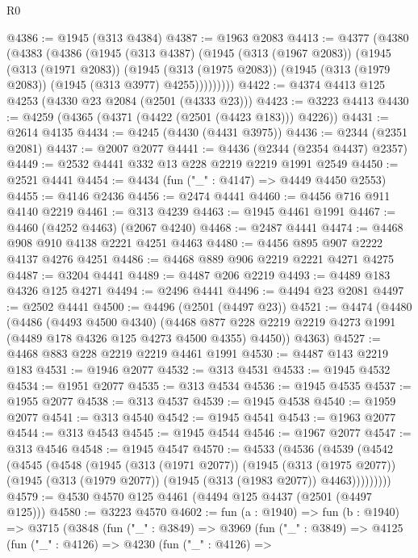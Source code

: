 \begin{lexlean}{R0}
\begin{coremodule}
@4386 := @1945 (@313 @4384)
@4387 := @1963 @2083
@4413 := @4377
    (@4380
      (@4383
        (@4386
          (@1945
            (@313 @4387)
            (@1945
              (@313 (@1967 @2083))
              (@1945
                (@313 (@1971 @2083))
                (@1945
                  (@313 (@1975 @2083))
                  (@1945 (@313 (@1979 @2083)) (@1945 (@313 @3977) @4255)))))))))
@4422 := @4374 @4413 @125 @4253 (@4330 @23 @2084 (@2501 (@4333 @23)))
@4423 := @3223 @4413
@4430 := @4259 (@4365 (@4371 (@4422 (@2501 (@4423 @183))) @4226))
@4431 := @2614 @4135
@4434 := @4245 (@4430 (@4431 @3975))
@4436 := @2344 (@2351 @2081)
@4437 := @2007 @2077
@4441 := @4436 (@2344 (@2354 @4437) @2357)
@4449 := @2532 @4441 @332 @13 @228 @2219 @2219 @1991 @2549
@4450 := @2521 @4441
@4454 := @4434 (fun ("_" : @4147) => @4449 @4450 @2553)
@4455 := @4146 @2436
@4456 := @2474 @4441
@4460 := @4456 @716 @911 @4140 @2219
@4461 := @313 @4239
@4463 := @1945 @4461 @1991
@4467 := @4460 (@4252 @4463) (@2067 @4240)
@4468 := @2487 @4441
@4474 := @4468 @908 @910 @4138 @2221 @4251 @4463
@4480 := @4456 @895 @907 @2222 @4137 @4276 @4251
@4486 := @4468 @889 @906 @2219 @2221 @4271 @4275
@4487 := @3204 @4441
@4489 := @4487 @206 @2219
@4493 := @4489 @183 @4326 @125 @4271
@4494 := @2496 @4441
@4496 := @4494 @23 @2081
@4497 := @2502 @4441
@4500 := @4496 (@2501 (@4497 @23))
@4521 := @4474
    (@4480
      (@4486
        (@4493 @4500 @4340)
        (@4468 @877 @228 @2219 @2219 @4273 @1991 (@4489 @178 @4326 @125 @4273 @4500 @4355) @4450))
      @4363)
@4527 := @4468 @883 @228 @2219 @2219 @4461 @1991
@4530 := @4487 @143 @2219 @183
@4531 := @1946 @2077
@4532 := @313 @4531
@4533 := @1945 @4532
@4534 := @1951 @2077
@4535 := @313 @4534
@4536 := @1945 @4535
@4537 := @1955 @2077
@4538 := @313 @4537
@4539 := @1945 @4538
@4540 := @1959 @2077
@4541 := @313 @4540
@4542 := @1945 @4541
@4543 := @1963 @2077
@4544 := @313 @4543
@4545 := @1945 @4544
@4546 := @1967 @2077
@4547 := @313 @4546
@4548 := @1945 @4547
@4570 := @4533
    (@4536
      (@4539
        (@4542
          (@4545
            (@4548
              (@1945
                (@313 (@1971 @2077))
                (@1945
                  (@313 (@1975 @2077))
                  (@1945 (@313 (@1979 @2077)) (@1945 (@313 (@1983 @2077)) @4463)))))))))
@4579 := @4530 @4570 @125 @4461 (@4494 @125 @4437 (@2501 (@4497 @125)))
@4580 := @3223 @4570
@4602 := fun (a : @1940) =>
  fun (b : @1940) =>
  @3715
    (@3848
      (fun ("_" : @3849) =>
      @3969
        (fun ("_" : @3849) =>
        @4125
          (fun ("_" : @4126) =>
          @4230
            (fun ("_" : @4126) =>

\end{coremodule}
\end{lexlean}
